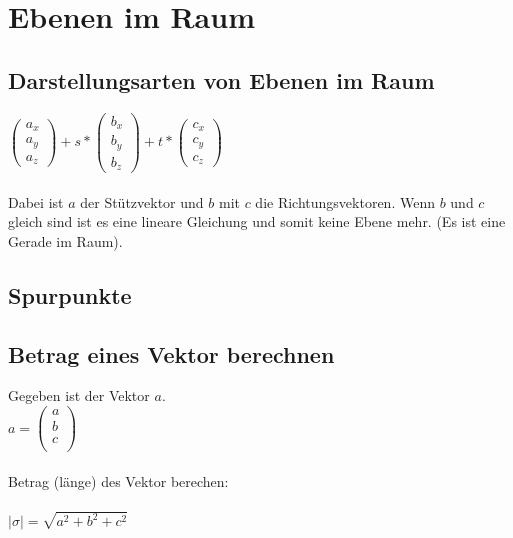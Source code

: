 
\section{Ebenen im Raum}
\subsection{Darstellungsarten von Ebenen im Raum}
$
\begin{pmatrix}
    a_x \\ a_y \\ a_z
\end{pmatrix}
+ s * 
\begin{pmatrix}
    b_x \\ b_y \\ b_z
\end{pmatrix}
+ t * 
\begin{pmatrix}
    c_x \\ c_y \\ c_z
\end{pmatrix}
$ 
\\\\
Dabei ist $a$ der Stützvektor und $b$ mit $c$ die Richtungsvektoren.
Wenn $b$ und $c$ gleich sind ist es eine lineare Gleichung und somit keine Ebene mehr. 
(Es ist eine Gerade im Raum).

\subsection{Spurpunkte}

\subsection{Betrag eines Vektor berechnen}
Gegeben ist der Vektor $a$. \\
$
a = 
\begin{pmatrix}
    a \\ b \\ c \\
\end{pmatrix}
$ 
\\\\
Betrag (länge) des Vektor berechen: \\\\
$
|\sigma| = \sqrt{a^2 + b^2 + c^2}
$

